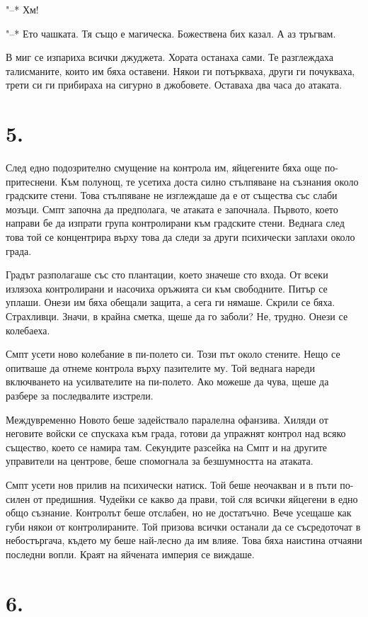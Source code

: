 \documentclass[ebook,openany,12pt]{memoir}
\begin{document}
"--* Хм!

"--* Ето чашката. Тя също е магическа. Божествена бих казал. А аз тръгвам.

В миг се изпариха всички джуджета. Хората останаха сами. Те разглеждаха талисманите, които им бяха оставени. Някои ги потъркваха, други ги почукваха, трети си ги прибираха на сигурно в джобовете. Оставаха два часа до атаката.

\section*{5.}

След едно подозрително смущение на контрола им, яйцегените бяха още по-притеснени. Към полунощ, те усетиха доста силно стълпяване на съзнания около градските стени. Това стълпяване не изглеждаше да е от същества със слаби мозъци. Смпт започна да предполага, че атаката е започнала. Първото, което направи бе да изпрати група контролирани към градските стени. Веднага след това той се концентрира върху това да следи за други психически заплахи около града.

Градът разполагаше със сто плантации, което значеше сто входа. От всеки излязоха контролирани и насочиха оръжията си към свободните. Питър се уплаши. Онези им бяха обещали защита, а сега ги нямаше. Скрили се бяха. Страхливци. Значи, в крайна сметка, щеше да го заболи? Не, трудно. Онези се колебаеха.

Смпт усети ново колебание в пи-полето си. Този път около стените. Нещо се опитваше да отнеме контрола върху пазителите му. Той веднага нареди включването на усилвателите на пи-полето. Ако можеше да чува, щеше да разбере за последвалите изстрели. 

Междувременно Новото беше задействало паралелна офанзива. Хиляди от неговите войски се спускаха към града, готови да упражнят контрол над всяко същество, което се намира там. Секундите разсейка на Смпт и на другите управители на центрове, беше спомогнала за безшумността на атаката.

Смпт усети нов прилив на психически натиск. Той беше неочакван и в пъти по-силен от предишния. Чудейки се какво да прави, той сля всички яйцегени в едно общо съзнание. Контролът беше отслабен, но не достатъчно. Вече усещаше как губи някои от контролираните. Той призова всички останали да се съсредоточат в небостъргача, където му беше най-лесно да им влияе. Това бяха наистина отчаяни последни вопли. Краят на яйчената империя се виждаше.

\section*{6.}
\end{document}
